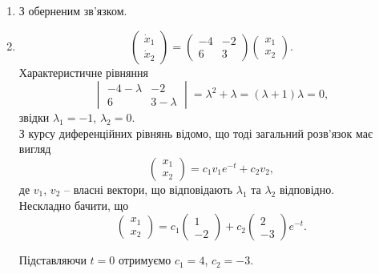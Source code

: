 \begin{solution}
	\begin{enumerate}
		\item З оберненим зв'язком.
		\item 
		\[
			\begin{pmatrix}
				\dot x_1 \\ 
				\dot x_2
			\end{pmatrix}
			=
			\begin{pmatrix}
				-4 & -2 \\
				6 & 3
			\end{pmatrix}
			\begin{pmatrix}
				x_1 \\
				x_2
			\end{pmatrix}.
		\]
		Характеристичне рівняння 
		\[
			\begin{vmatrix}
				-4 - \lambda & -2 \\
				6 & 3 - \lambda 
			\end{vmatrix}
			=
			\lambda^2 + \lambda 
			=
			(\lambda + 1) \lambda
			=
			0,
		\]
		звідки $\lambda_1 = -1$, $\lambda_2 = 0$.\\
		
		З курсу диференційних рівнянь відомо, що тоді загальний розв'язок має вигляд
		\[
			\begin{pmatrix}
				x_1 \\
				x_2
			\end{pmatrix}
			=
			c_1 v_1 e^{-t} + c_2 v_2,
		\]
		де $v_1$, $v_2$ -- власні вектори, що відповідають $\lambda_1$ та $\lambda_2$ відповідно.\\
		
		Нескладно бачити, що 
		\[
			\begin{pmatrix}
				x_1 \\
				x_2
			\end{pmatrix}
			=
			c_1 
			\begin{pmatrix}
				1 \\
				-2
			\end{pmatrix} 
			+ 
			c_2 
			\begin{pmatrix}
				2 \\
				-3
			\end{pmatrix}
			e^{-t} .
		\]
		
		Підставляючи $t=0$ отримуємо $c_1 = 4$, $c_2 = -3$.\\
		

\end{enumerate}
\end{solution}

